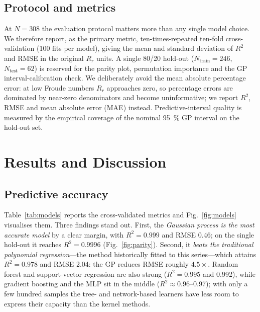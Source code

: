 \documentclass[conference]{IEEEtran}
\begin{document}
\subsection{Protocol and metrics}
At $N=\num{308}$ the evaluation protocol matters more than any single model
choice. We therefore report, as the primary metric, ten-times-repeated ten-fold
cross-validation (\num{100} fits per model), giving the mean and standard
deviation of $R^{2}$ and RMSE in the original $R_r$ units. A single
\SI{80}{}/\SI{20}{} hold-out ($N_{\text{train}}=\num{246}$,
$N_{\text{test}}=\num{62}$) is reserved for the parity plot, permutation
importance and the GP interval-calibration check. We deliberately avoid the mean
absolute percentage error: at low Froude numbers $R_r$ approaches zero, so
percentage errors are dominated by near-zero denominators and become
uninformative; we report $R^{2}$, RMSE and mean absolute error (MAE) instead.
Predictive-interval quality is measured by the empirical coverage of the nominal
\SI{95}{\percent} GP interval on the hold-out set.

\section{Results and Discussion}
\label{sec:results}

\subsection{Predictive accuracy}
Table~\ref{tab:models} reports the cross-validated metrics and
Fig.~\ref{fig:models} visualises them. Three findings stand out. First, the
\emph{Gaussian process is the most accurate model} by a clear margin, with
$R^{2}=\num{0.999}$ and RMSE \num{0.46}; on the single hold-out it reaches
$R^{2}=\num{0.9996}$ (Fig.~\ref{fig:parity}). Second, it \emph{beats the
traditional polynomial regression}---the method historically fitted to this
series---which attains $R^{2}=\num{0.978}$ and RMSE \num{2.04}: the GP reduces
RMSE roughly $4.5\times$. Random forest and support-vector regression are also
strong ($R^{2}=\num{0.995}$ and \num{0.992}), while gradient boosting and the
MLP sit in the middle ($R^{2}\approx\num{0.96}$--\num{0.97}); with only a few
hundred samples the tree- and network-based learners have less room to express
their capacity than the kernel methods.
\end{document}
